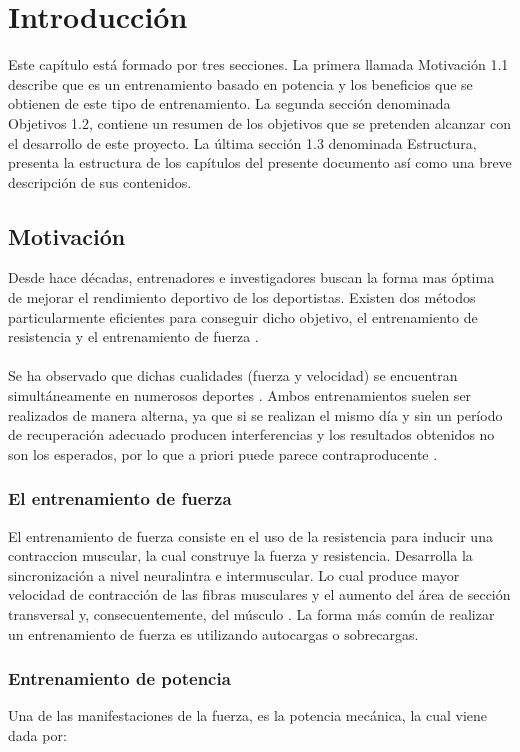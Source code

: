 \chapter{Introducción}
Este capítulo está formado por tres secciones. La primera llamada Motivación 1.1 describe que es un entrenamiento basado en potencia y los beneficios que se obtienen de este tipo de entrenamiento. La segunda sección denominada Objetivos 1.2, contiene un resumen de los objetivos que se pretenden alcanzar con el desarrollo de este proyecto. La última sección 1.3 denominada Estructura, presenta la estructura de los capítulos del presente documento así como una breve descripción de sus contenidos.
\section{Motivación}

Desde hace décadas, entrenadores e investigadores buscan la forma mas óptima de mejorar el rendimiento deportivo de los deportistas. Existen dos métodos particularmente eficientes para conseguir dicho objetivo, el entrenamiento de resistencia y el entrenamiento de fuerza \cite{Patron}.
\\
\\
Se ha observado que dichas cualidades (fuerza y velocidad) se encuentran simultáneamente en numerosos deportes \cite{Docherty}. Ambos entrenamientos suelen ser realizados de manera alterna, ya que si se realizan el mismo día y sin un período de recuperación adecuado producen interferencias y los resultados obtenidos no son los esperados, por lo que a priori puede parece contraproducente \cite{Robert}.

\subsection{El entrenamiento de fuerza}

El entrenamiento de fuerza consiste en el uso de la resistencia para inducir una contraccion muscular, la cual construye la fuerza y resistencia. Desarrolla la sincronización a nivel neuralintra e intermuscular. Lo cual produce mayor velocidad de contracción de las fibras musculares y el aumento del área de sección transversal y, consecuentemente, del músculo \cite{Brad}. La forma más común de realizar un entrenamiento de fuerza es utilizando autocargas o sobrecargas.
\subsection{Entrenamiento de potencia}
Una de las manifestaciones de la fuerza, es la potencia mecánica, la cual viene dada por:

